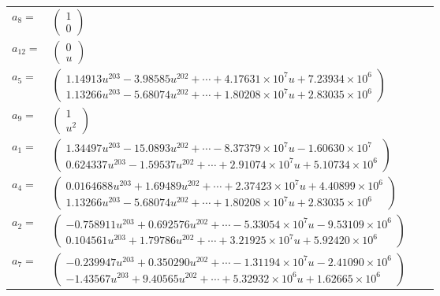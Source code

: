 \documentclass[1p]{elsarticle_modified}
\theoremstyle{definition}
\begin{document}
\begin{tabular}{m{7pt} m{180pt} m{7pt} m{180pt} }
\flushright $a_{8}=$&$\begin{pmatrix}1\\0\end{pmatrix}$ \\
\flushright $a_{12}=$&$\begin{pmatrix}0\\u\end{pmatrix}$ \\
\flushright $a_{5}=$&$\begin{pmatrix}1.14913 u^{203}-3.98585 u^{202}+\cdots+4.17631\times10^{7} u+7.23934\times10^{6}\\1.13266 u^{203}-5.68074 u^{202}+\cdots+1.80208\times10^{7} u+2.83035\times10^{6}\end{pmatrix}$ \\
\flushright $a_{9}=$&$\begin{pmatrix}1\\u^2\end{pmatrix}$ \\
\flushright $a_{1}=$&$\begin{pmatrix}1.34497 u^{203}-15.0893 u^{202}+\cdots-8.37379\times10^{7} u-1.60630\times10^{7}\\0.624337 u^{203}-1.59537 u^{202}+\cdots+2.91074\times10^{7} u+5.10734\times10^{6}\end{pmatrix}$ \\
\flushright $a_{4}=$&$\begin{pmatrix}0.0164688 u^{203}+1.69489 u^{202}+\cdots+2.37423\times10^{7} u+4.40899\times10^{6}\\1.13266 u^{203}-5.68074 u^{202}+\cdots+1.80208\times10^{7} u+2.83035\times10^{6}\end{pmatrix}$ \\
\flushright $a_{2}=$&$\begin{pmatrix}-0.758911 u^{203}+0.692576 u^{202}+\cdots-5.33054\times10^{7} u-9.53109\times10^{6}\\0.104561 u^{203}+1.79786 u^{202}+\cdots+3.21925\times10^{7} u+5.92420\times10^{6}\end{pmatrix}$ \\
\flushright $a_{7}=$&$\begin{pmatrix}-0.239947 u^{203}+0.350290 u^{202}+\cdots-1.31194\times10^{7} u-2.41090\times10^{6}\\-1.43567 u^{203}+9.40565 u^{202}+\cdots+5.32932\times10^{6} u+1.62665\times10^{6}\end{pmatrix}$ \\

\end{tabular}
\end{document}
